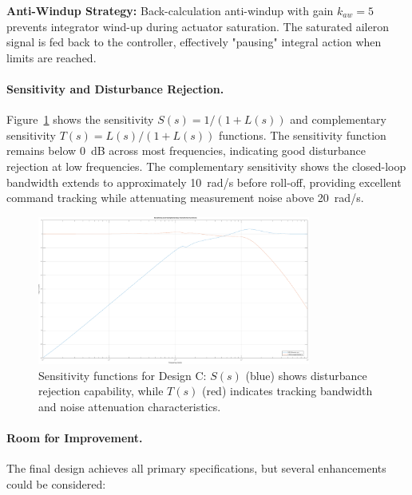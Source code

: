 \textbf{Anti-Windup Strategy:}
Back-calculation anti-windup with gain $k_{aw}=5$ prevents integrator wind-up during actuator saturation. The saturated aileron signal is fed back to the controller, effectively "pausing" integral action when limits are reached.

\paragraph{Sensitivity and Disturbance Rejection.}
Figure~\ref{fig:sensitivity_functions} shows the sensitivity $S(s) = 1/(1+L(s))$ and complementary sensitivity $T(s) = L(s)/(1+L(s))$ functions. The sensitivity function remains below 0~dB across most frequencies, indicating good disturbance rejection at low frequencies. The complementary sensitivity shows the closed-loop bandwidth extends to approximately 10~rad/s before roll-off, providing excellent command tracking while attenuating measurement noise above 20~rad/s.

\begin{figure}[h!]
\centering
\includegraphics[width=0.8\textwidth]{../MATLAB/LaTeX_Exports/sensitivity_functions.pdf}
\caption{Sensitivity functions for Design C: $S(s)$ (blue) shows disturbance rejection capability, while $T(s)$ (red) indicates tracking bandwidth and noise attenuation characteristics.}
\label{fig:sensitivity_functions}
\end{figure}

\paragraph{Room for Improvement.}

The final design achieves all primary specifications, but several enhancements could be considered:

